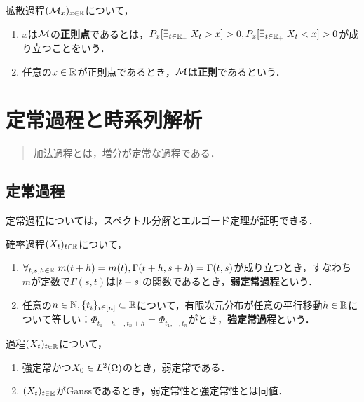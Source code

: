 \documentclass[uplatex,dvipdfmx]{jsreport}
\begin{document}
\begin{definition}
    拡散過程$(\mathcal{M}_x)_{x\in\mathbb{R}}$について，
    \begin{enumerate}
        \item $x$は$\mathcal{M}$の\textbf{正則点}であるとは，$P_x[\exists_{t\in\mathbb{R}_+}\;X_t>x]>0,P_x[\exists_{t\in\mathbb{R}_+}\;X_t<x]>0$が成り立つことをいう．
        \item 任意の$x\in\mathbb{R}$が正則点であるとき，$\mathcal{M}$は\textbf{正則}であるという．
    \end{enumerate}
\end{definition}

\chapter{定常過程と時系列解析}

\begin{quotation}
    加法過程とは，増分が定常な過程である．
\end{quotation}

\section{定常過程}

\begin{tcolorbox}[colframe=ForestGreen, colback=ForestGreen!10!white,breakable,colbacktitle=ForestGreen!40!white,coltitle=black,fonttitle=\bfseries\sffamily,
title=]
    定常過程については，スペクトル分解とエルゴード定理が証明できる．
\end{tcolorbox}

\begin{definition}
    確率過程$(X_t)_{t\in\mathbb{R}}$について，
    \begin{enumerate}
        \item $\forall_{t,s,h\in\mathbb{R}}\;m(t+h)=m(t),\Gamma(t+h,s+h)=\Gamma(t,s)$が成り立つとき，すなわち$m$が定数で$\Gamma(s,t)$は$\lvert t-s\rvert$の関数であるとき，\textbf{弱定常過程}という．
        \item 任意の$n\in\mathbb{N},\{t_i\}_{i\in[n]}\subset\mathbb{R}$について，有限次元分布が任意の平行移動$h\in\mathbb{R}$について等しい：$\Phi_{t_1+h,\cdots,t_n+h}=\Phi_{t_1,\cdots,t_n}$がとき，\textbf{強定常過程}という．
    \end{enumerate}
\end{definition}

\begin{lemma}
    過程$(X_t)_{t\in\mathbb{R}}$について，
    \begin{enumerate}
        \item 強定常かつ$X_0\in L^2(\Omega)$のとき，弱定常である．
        \item $(X_t)_{t\in\mathbb{R}}$がGaussであるとき，弱定常性と強定常性とは同値．
    \end{enumerate}
\end{lemma}
\end{document}
